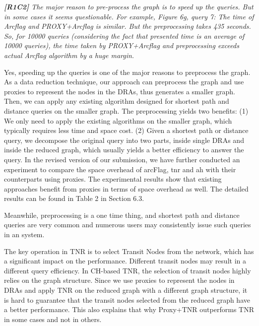 \documentclass[11pt]{letter}
\newcommand{\svs}{\vspace{0.36ex}}
\newcommand{\ah}{{\sc ah}\xspace}
\newcommand{\arcflag}{{\sc arcFlag}\xspace}
\newcommand{\tnr}{{\sc tnr}\xspace}
\begin{document}
\noindent
{\em
{\bf [R1C2]}  The major reason to pre-process the graph is to speed up the queries. But in some cases it seems questionable. For example, Figure 6g, query 7: The time of Arcflag and PROXY+Arcflag
is similar. But the preprocessing takes 435 seconds. So, for 10000 queries (considering the fact that presented time is an average of 10000 queries), the time taken by PROXY+Arcflag and preprocessing exceeds actual Arcflag algorithm by a huge margin.}
\svs

Yes, speeding up the queries is one of the major reasons to preprocess the graph. As a data reduction technique, our approach can preprocess the graph and use proxies to represent the nodes in the DRAs, thus generates a smaller graph. Then, we can apply any existing algorithm designed for shortest path and distance queries on the smaller graph. The preprocessing yields two benefits: (1) We only need to apply the existing algorithms on the smaller graph, which typically requires less time and space cost. (2) Given a shortest path or distance query, we decompose the original query into two parts, inside single DRAs and inside the reduced graph, which usually yields a better efficiency to answer the query. In the revised version of our submission, we have further conducted an experiment to compare the space overhead of \arcflag, \tnr and \ah with their counterparts using proxies. The experimental results show that existing approaches benefit from proxies in terms of space overhead as well. The detailed results can be found in Table 2 in Section 6.3.

Meanwhile, preprocessing is a one time thing, and shortest path and distance queries are very common and numerous users may consistently issue such queries in an system.



\svs
The key operation in TNR is to select Transit Nodes from the network, which has a significant impact on the performance. Different transit nodes may result in a different query efficiency. In CH-based TNR, the selection of transit nodes highly relies on the graph structure. Since we use proxies to represent the nodes in DRAs and apply TNR on the reduced graph with a different graph structure, it is hard to guarantee that the transit nodes selected from the reduced graph have a better performance. This also explains that why Proxy+TNR outperforms TNR in some cases and not in others.
\end{document}
